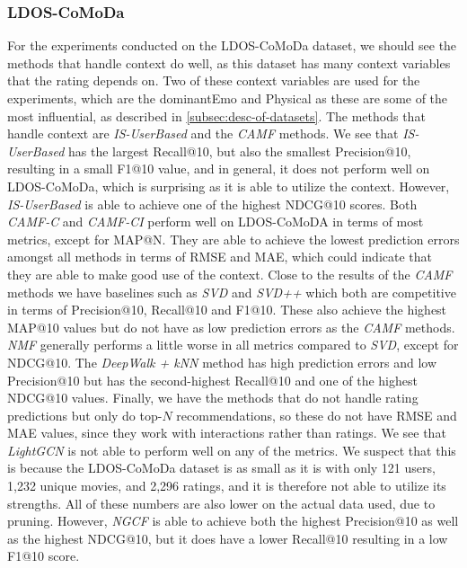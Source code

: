 \subsubsection{LDOS-CoMoDa}
For the experiments conducted on the LDOS-CoMoDa dataset, we should see the methods that handle context do well, as this dataset has many context variables that the rating depends on.
Two of these context variables are used for the experiments, which are the dominantEmo and Physical as these are some of the most influential, as described in \autoref{subsec:desc-of-datasets}.
The methods that handle context are \textit{IS-UserBased} and the \textit{CAMF} methods.
We see that \textit{IS-UserBased} has the largest Recall@10, but also the smallest Precision@10, resulting in a small F1@10 value, and in general, it does not perform well on LDOS-CoMoDa, which is surprising as it is able to utilize the context.
However, \textit{IS-UserBased} is able to achieve one of the highest NDCG@10 scores.
Both \textit{CAMF-C} and \textit{CAMF-CI} perform well on LDOS-CoMoDA in terms of most metrics, except for MAP@N.
They are able to achieve the lowest prediction errors amongst all methods in terms of RMSE and MAE, which could indicate that they are able to make good use of the context.
Close to the results of the \textit{CAMF} methods we have baselines such as \textit{SVD} and \textit{SVD++} which both are competitive in terms of Precision@10, Recall@10 and F1@10. 
These also achieve the highest MAP@10 values but do not have as low prediction errors as the \textit{CAMF} methods.
\textit{NMF} generally performs a little worse in all metrics compared to \textit{SVD}, except for NDCG@10.
The \textit{DeepWalk + kNN} method has high prediction errors and low Precision@10 but has the second-highest Recall@10 and one of the highest NDCG@10 values.
Finally, we have the methods that do not handle rating predictions but only do top-$N$ recommendations, so these do not have RMSE and MAE values, since they work with interactions rather than ratings.
We see that \textit{LightGCN} is not able to perform well on any of the metrics.
We suspect that this is because the LDOS-CoMoDa dataset is as small as it is with only 121 users, 1,232 unique movies, and 2,296 ratings, and it is therefore not able to utilize its strengths.
All of these numbers are also lower on the actual data used, due to pruning.
However, \textit{NGCF} is able to achieve both the highest Precision@10 as well as the highest NDCG@10, but it does have a lower Recall@10 resulting in a low F1@10 score.
\\\\
